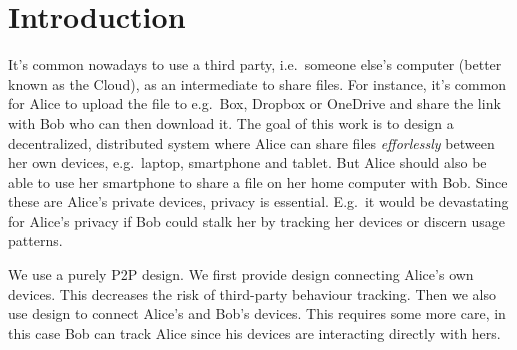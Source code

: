 \section{Introduction}


It's common nowadays to use a third party, i.e.\ someone else's computer (better 
known as the Cloud), as an intermediate to share files.
For instance, it's common for Alice to upload the file to e.g.\ Box, Dropbox or 
OneDrive and share the link with Bob who can then download it.
The goal of this work is to design a decentralized, distributed system where 
Alice can share files \emph{efforlessly} between her own devices, e.g.\ laptop, 
smartphone and tablet.
But Alice should also be able to use her smartphone to share a file on her home 
computer with Bob.
Since these are Alice's private devices, privacy is essential.
E.g.\ it would be devastating for Alice's privacy if Bob could stalk her by 
tracking her devices or discern usage patterns.




We use a purely \ac{P2P} design.
We first provide  design connecting Alice's own devices.
This decreases the risk of third-party behaviour tracking.
Then we also use  design to connect Alice's and Bob's devices.
This requires some more care, in this case Bob can track Alice since his devices 
are interacting directly with hers.


